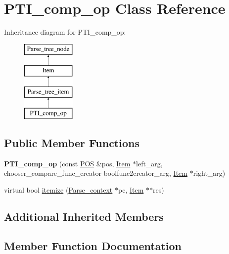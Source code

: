 \hypertarget{classPTI__comp__op}{}\section{P\+T\+I\+\_\+comp\+\_\+op Class Reference}
\label{classPTI__comp__op}
Inheritance diagram for P\+T\+I\+\_\+comp\+\_\+op\+:\begin{figure}[H]
\begin{center}
\leavevmode
\includegraphics[height=4.000000cm]{classPTI__comp__op}
\end{center}
\end{figure}
\subsection*{Public Member Functions}
\begin{DoxyCompactItemize}
\item 
\mbox{\label{classPTI__comp__op_a57e72b4147adfc2d91daa2cfbeebc781}} 
{\bfseries P\+T\+I\+\_\+comp\+\_\+op} (const \mbox{\hyperlink{structYYLTYPE}{P\+OS}} \&pos, \mbox{\hyperlink{classItem}{Item}} $\ast$left\+\_\+arg, chooser\+\_\+compare\+\_\+func\+\_\+creator boolfunc2creator\+\_\+arg, \mbox{\hyperlink{classItem}{Item}} $\ast$right\+\_\+arg)
\item 
virtual bool \mbox{\hyperlink{classPTI__comp__op_a934bb7f11536d59eea997d9ac5e276aa}{itemize}} (\mbox{\hyperlink{structParse__context}{Parse\+\_\+context}} $\ast$pc, \mbox{\hyperlink{classItem}{Item}} $\ast$$\ast$res)
\end{DoxyCompactItemize}
\subsection*{Additional Inherited Members}


\subsection{Member Function Documentation}
\mbox{\label{classPTI__comp__op_a934bb7f11536d59eea997d9ac5e276aa}} 
